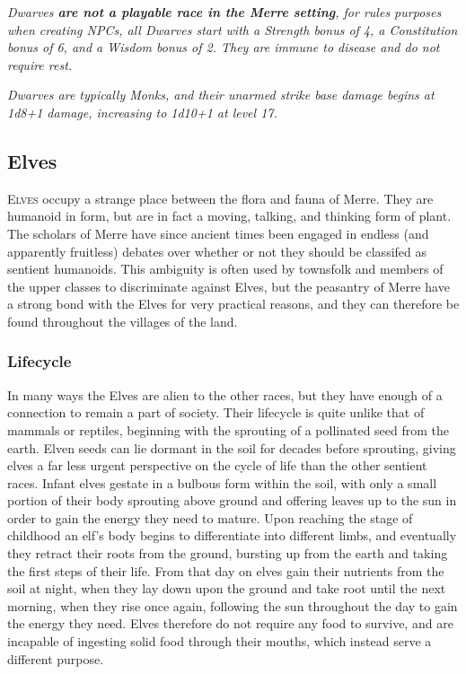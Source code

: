 \documentclass[paper=a4, fontsize=11pt]{scrartcl} %
\begin{document}
\begin{multicols}{2}
\textit{Dwarves \textbf{are not a playable race in the Merre setting}, for rules purposes when creating NPCs, all Dwarves start with a Strength bonus of 4, a Constitution bonus of 6, and a Wisdom bonus of 2. They are immune to disease and do not require rest.}

\textit{Dwarves are typically Monks, and their unarmed strike base damage begins at 1d8+1 damage, increasing to 1d10+1 at level 17.}

\subsection*{Elves}

\lettrine[lines=2]{\medievalsharp E}{lves} occupy a strange place between the flora and fauna of Merre. They are humanoid in form, but are in fact a moving, talking, and thinking form of plant. The scholars of Merre have since ancient times been engaged in endless (and apparently fruitless) debates over whether or not they should be classifed as sentient humanoids. This ambiguity is often used by townsfolk and members of the upper classes to discriminate against Elves, but the peasantry of Merre have a strong bond with the Elves for very practical reasons, and they can therefore be found throughout the villages of the land.

\subsubsection{Lifecycle}

In many ways the Elves are alien to the other races, but they have enough of a connection to remain a part of society. Their lifecycle is quite unlike that of mammals or reptiles, beginning with the sprouting of a pollinated seed from the earth. Elven seeds can lie dormant in the soil for decades before sprouting, giving elves a far less urgent perspective on the cycle of life than the other sentient races. Infant elves gestate in a bulbous form within the soil, with only a small portion of their body sprouting above ground and offering leaves up to the sun in order to gain the energy they need to mature. Upon reaching the stage of childhood an elf's body begins to differentiate into different limbs, and eventually they retract their roots from the ground, bursting up from the earth and taking the first steps of their life. From that day on elves gain their nutrients from the soil at night, when they lay down upon the ground and take root until the next morning, when they rise once again, following the sun throughout the day to gain the energy they need. Elves therefore do not require any food to survive, and are incapable of ingesting solid food through their mouths, which instead serve a different purpose.


\end{multicols}
\end{document}
